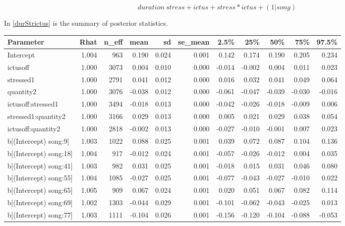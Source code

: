 \begin{equation}
duration ~ stress + ictus + stress*ictus + (1|song)
\end{equation}

In \ref{durStrictus} is the summary of posterior statistics. 
\begin{longtable}{lrrrrrrrrrr}
  \toprule
Parameter & Rhat & n\_eff & mean & sd & se\_mean & 2.5\% & 25\% & 50\% & 75\% & 97.5\% \\ 
  \midrule
Intercept & 1.004 &  963 & 0.190 & 0.024 & 0.001 & 0.142 & 0.174 & 0.190 & 0.205 & 0.234 \\ 
  ictusoff & 1.000 & 3073 & 0.004 & 0.010 & 0.000 & -0.014 & -0.002 & 0.004 & 0.011 & 0.023 \\ 
  stressed1 & 1.000 & 2791 & 0.041 & 0.012 & 0.000 & 0.016 & 0.032 & 0.041 & 0.049 & 0.064 \\ 
  quantity2 & 1.000 & 3076 & -0.038 & 0.012 & 0.000 & -0.061 & -0.047 & -0.039 & -0.030 & -0.016 \\ 
  ictusoff:stressed1 & 1.000 & 3494 & -0.018 & 0.013 & 0.000 & -0.042 & -0.026 & -0.018 & -0.009 & 0.006 \\ 
  stressed1:quantity2 & 1.000 & 3166 & 0.029 & 0.013 & 0.000 & 0.005 & 0.021 & 0.029 & 0.038 & 0.054 \\ 
  ictusoff:quantity2 & 1.000 & 2818 & -0.002 & 0.013 & 0.000 & -0.027 & -0.010 & -0.001 & 0.007 & 0.023 \\ 
  b[(Intercept) song:9] & 1.003 & 1022 & 0.088 & 0.025 & 0.001 & 0.039 & 0.072 & 0.087 & 0.104 & 0.136 \\ 
  b[(Intercept) song:18] & 1.004 &  917 & -0.012 & 0.024 & 0.001 & -0.057 & -0.026 & -0.012 & 0.004 & 0.035 \\ 
  b[(Intercept) song:41] & 1.003 &  982 & 0.031 & 0.025 & 0.001 & -0.018 & 0.015 & 0.031 & 0.046 & 0.080 \\ 
  b[(Intercept) song:55] & 1.004 & 1085 & -0.027 & 0.025 & 0.001 & -0.077 & -0.043 & -0.027 & -0.010 & 0.022 \\ 
  b[(Intercept) song:65] & 1.005 &  909 & 0.067 & 0.024 & 0.001 & 0.020 & 0.051 & 0.067 & 0.082 & 0.114 \\ 
  b[(Intercept) song:69] & 1.002 & 1303 & -0.044 & 0.029 & 0.001 & -0.101 & -0.062 & -0.043 & -0.025 & 0.013 \\ 
  b[(Intercept) song:77] & 1.003 & 1111 & -0.104 & 0.026 & 0.001 & -0.156 & -0.120 & -0.104 & -0.088 & -0.053 \\ 

\end{longtable}
